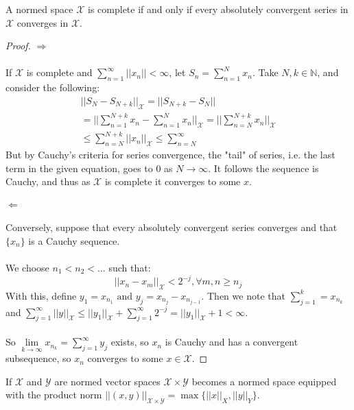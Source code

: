 \documentclass[12pt]{article}
\newcommand{\X}{\mathcal{X}}
\newcommand{\Y}{\mathcal{Y}}
\newcommand{\bignorm}{\Big | \Big |}
\newenvironment{theorem}[2][Theorem]{\begin{trivlist}
\item[\hskip \labelsep {\bfseries #1}\hskip \labelsep {\bfseries #2.}]}{\end{trivlist}}
\begin{document}
\begin{theorem}{(Completeness characterization)}
    A normed space $\X$ is complete if and only if every absolutely convergent series in $\X$ converges in $\X$. 
    \begin{proof}
        $\Rightarrow$
        \\ \\
        If $\X$ is complete and $\sum_{n = 1}^\infty ||x_n|| < \infty$, let $S_n = \sum_{n = 1}^N x_n$. Take $N, k \in \mathbb{N}$, and consider the following:
        \begin{equation}
            \begin{aligned}
                ||S_N - S_{N + k}||_\X = ||S_{N + k} - S_N|| \\
                = \bignorm \sum_{n = 1}^{N + k} x_n - \sum_{n = 1}^{N} x_n \bignorm_\X = \bignorm \sum_{n = N}^{N + k} x_n \bignorm_\X \\
                \leq \sum_{n = N}^{N + k} ||x_n||_\X \leq \sum_{n = N}^\infty 
            \end{aligned}
        \end{equation}
        But by Cauchy's criteria for series convergence, the "tail" of series, i.e. the last term in the given equation, goes to $0$ as $N \rightarrow \infty$. It follows the sequence is Cauchy, and thus as $\X$ is complete it converges to some $x$. 
        \\ \\
        $\Leftarrow$
        \\ \\ 
        Conversely, suppose that every absolutely convergent series converges and that $\{x_n\}$ is a Cauchy sequence. \\ \\
        We choose $n_1 < n_2 < ...$ such that:
        $$||x_n - x_m||_\X < 2^{-j}, \forall m, n \geq n_j$$
        With this, define $y_1 = x_{n_1} \text{ and } y_j = x_{n_j} - x_{n_{j - 1}}$. Then we note that $\sum_{j = 1}^k = x_{n_k}$ and $\sum_{j = 1}^\infty ||y||_{\X} \leq ||y_1||_{\X} + \sum_{j = 1}^{\infty} 2^{-j} = ||y_1||_{\X} + 1 < \infty$. \\ \\
        So $\underset{k \rightarrow \infty}{\lim}x_{n_k} = \sum_{j = 1}^{\infty} y_j$ exists, so $x_n$ is Cauchy and has a convergent subsequence, so $x_n$ converges to some $x \in \X$. 
    \end{proof}
\end{theorem}
If $\X$ and $\Y$ are normed vector spaces $\X \times \Y$ becomes a normed space equipped with the product norm $||(x,y)||_{\X \times \Y} = \max\{||x||_{X}, ||y||_{Y}\}$. 
\end{document}
